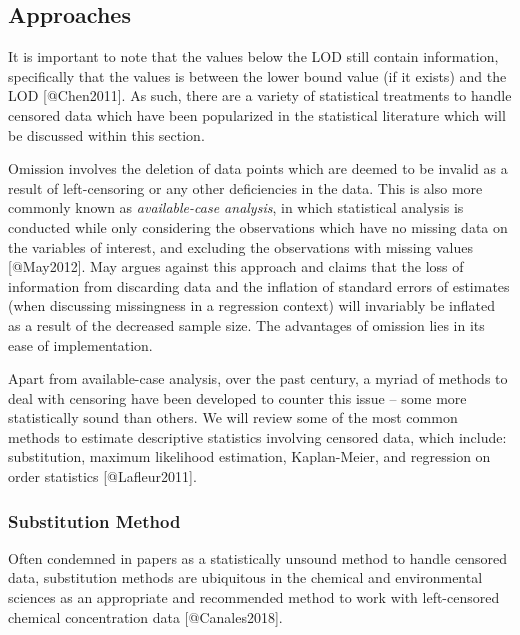 \documentclass[
]{article}
\begin{document}
\hypertarget{Approaches}{%
\subsection{Approaches}\label{Approaches}}

It is important to note that the values below the LOD still contain
information, specifically that the values is between the lower bound
value (if it exists) and the LOD {[}@Chen2011{]}. As such, there are a
variety of statistical treatments to handle censored data which have
been popularized in the statistical literature which will be discussed
within this section.

Omission involves the deletion of data points which are deemed to be
invalid as a result of left-censoring or any other deficiencies in the
data. This is also more commonly known as \emph{available-case
analysis}, in which statistical analysis is conducted while only
considering the observations which have no missing data on the variables
of interest, and excluding the observations with missing values
{[}@May2012{]}. May argues against this approach and claims that the
loss of information from discarding data and the inflation of standard
errors of estimates (when discussing missingness in a regression
context) will invariably be inflated as a result of the decreased sample
size. The advantages of omission lies in its ease of implementation.

Apart from available-case analysis, over the past century, a myriad of
methods to deal with censoring have been developed to counter this issue
-- some more statistically sound than others. We will review some of the
most common methods to estimate descriptive statistics involving
censored data, which include: substitution, maximum likelihood
estimation, Kaplan-Meier, and regression on order statistics
{[}@Lafleur2011{]}.

\hypertarget{Substitution}{%
\subsubsection{Substitution Method}\label{Substitution}}

Often condemned in papers as a statistically unsound method to handle
censored data, substitution methods are ubiquitous in the chemical and
environmental sciences as an appropriate and recommended method to work
with left-censored chemical concentration data {[}@Canales2018{]}.
\end{document}
